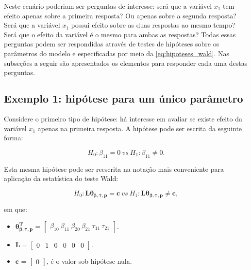 Neste cenário poderiam ser perguntas de interesse: será que a variável $x_1$ tem efeito apenas sobre a primeira resposta? Ou apenas sobre a segunda resposta? Será que a variável $x_1$ possui efeito sobre as duas respostas ao mesmo tempo? Será que o efeito da variável é o mesmo para ambas as respostas? Todas essas perguntas podem ser respondidas através de testes de hipóteses sobre os parâmetros do modelo e especificadas por meio da \autoref{eq:hipoteses_wald}. Nas subseções a seguir são apresentados os elementos para responder cada uma destas perguntas. 

\subsection{Exemplo 1: hipótese para um único parâmetro}

Considere o primeiro tipo de hipótese: há interesse em avaliar se existe efeito da variável $x_1$ apenas na primeira resposta. A hipótese pode ser escrita da seguinte forma:

\begin{equation}
H_0: \beta_{11} = 0 \ vs \ H_1: \beta_{11} \neq 0.
\end{equation}

Esta mesma hipótese pode ser reescrita na notação mais conveniente para aplicação da estatística do teste Wald:

\begin{equation}
H_0: \boldsymbol{L}\boldsymbol{\theta_{\beta,\tau,p}} = \boldsymbol{c} \ vs \ H_1: \boldsymbol{L}\boldsymbol{\theta_{\beta,\tau,p}} \neq \boldsymbol{c},
\end{equation}

\noindent em que:

\begin{itemize}
  
  \item $\boldsymbol{\theta_{\beta,\tau,p}^T}$ = $\begin{bmatrix} \beta_{10} \  \beta_{11} \ \beta_{20} \ \beta_{21} \ \tau_{11} \ \tau_{21} \end{bmatrix}$.


\item $\boldsymbol{L} = \begin{bmatrix} 0 & 1 & 0 & 0 & 0 & 0  \end{bmatrix}.$
 
\item $\boldsymbol{c}$ = $\begin{bmatrix} 0 \end{bmatrix}$, é o valor sob hipótese nula. 

\end{itemize}


